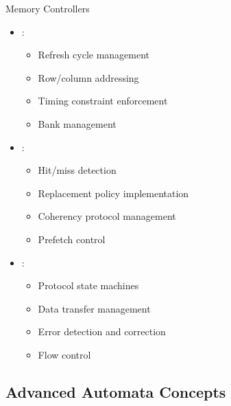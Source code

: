 \begin{frame}{Memory Controllers}
\begin{itemize}
\item {}:
\begin{itemize}
\item Refresh cycle management
\item Row/column addressing
\item Timing constraint enforcement
\item Bank management
\end{itemize}
\vspace{0.5cm}
\item {}:
\begin{itemize}
\item Hit/miss detection
\item Replacement policy implementation
\item Coherency protocol management
\item Prefetch control
\end{itemize}
\vspace{0.3cm}
\item {}:
\begin{itemize}
\item Protocol state machines
\item Data transfer management
\item Error detection and correction
\item Flow control
\end{itemize}
\end{itemize}
\end{frame}

\subsection{Advanced Automata Concepts}

